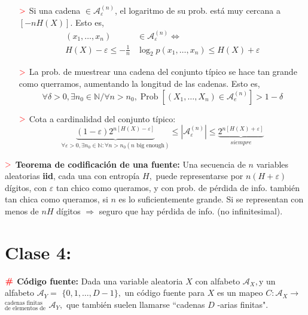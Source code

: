 \documentclass[%
 reprint,
 amsmath,amssymb,
 aps,
]{revtex4-1}
\begin{document}
\begin{enumerate}
  \item[$\textcolor{red}{\mathbf{>}}$] Si una cadena $\in\mathcal{A}_{\varepsilon}^{(n)}$, el logaritmo de su prob. está muy cercana a $[-n H(X)]$. Esto es, 
  $$
  \begin{aligned}
    \left(x_{1}, \ldots, x_{n}\right) & \in \mathcal{A}_{\varepsilon}^{(n)} \Leftrightarrow\\
    H(X)-\varepsilon \leq-\frac{1}{n} & \log _{2} p\left(x_{1}, \ldots, x_{n}\right) \leq H(X)+\varepsilon
  \end{aligned}$$
  
  \item[$\textcolor{red}{\mathbf{>}}$] La prob. de muestrear una cadena del conjunto típico se hace tan grande como querramos,
  aumentando la longitud de las cadenas. Esto es,
  $$
  \forall \delta>0, \exists n_{0} \in \mathbb{N} / \forall n>n_{0}, \operatorname{Prob}\left[\left(X_{1}, \ldots, X_{n}\right) \in \mathcal{A}_{e}^{(n)}\right]>1-\delta
  $$
  \item[$\textcolor{red}{\mathbf{>}}$] Cota a cardinalidad del conjunto típico:
  $$
  \underbrace{(1-\varepsilon) 2^{n[H(X)-\varepsilon]}}_{\forall \varepsilon>0, \exists n_{0} \in \mathbb{N} : \forall n>n_{0}(n \text{ big enough})}
  \leq
  \left|\mathcal{A}_{\varepsilon}^{(n)}\right| 
  \leq 
  \underbrace{2^{n[H(X)+\varepsilon]}}_{siempre}
  $$
\end{enumerate}

\textbf{$\textcolor{red}{\mathbf{>}}$ Teorema de codificación de una fuente:}
Una secuencia de $n$ variables aleatorias \textbf{iid}, cada una con entropía $H,$ puede representarse por $n(H+\varepsilon)$
dígitos, con $\varepsilon$ tan chico como queramos, y con prob. de pérdida de info. también tan chica
como queramos, si $n$ es lo suficientemente grande. Si se representan con menos de $n H$ dígitos $\Rightarrow$
seguro que hay pérdida de info. (no infinitesimal).

\section{Clase 4:}

\textbf{$\color{red}{\textbf{\#}}$ Código fuente:} 
Dada una variable aleatoria $X$ con alfabeto $\mathcal{A}_{X}, \mathrm{y}$ un alfabeto $\mathcal{A}_{Y}=$
$\{0,1, \ldots, D-1\},$ un código fuente para $X$ es un mapeo $C: \mathcal{A}_{X} \rightarrow$ $^\text{cadenas finitas}
_\text{de elementos de}$
$\mathcal{A}_{Y},$ que también suelen llamarse ``cadenas $D$ -arias finitas".
\end{document}
